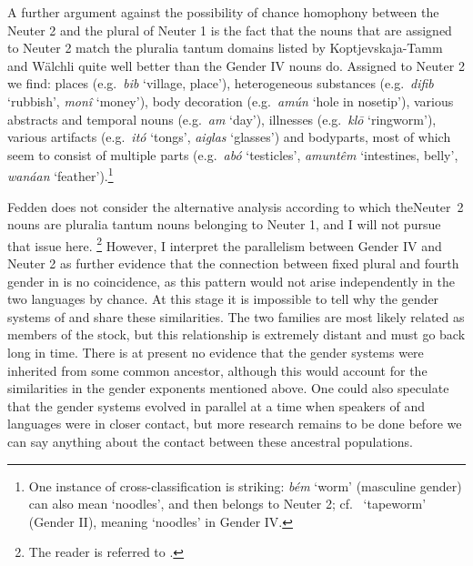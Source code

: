 \documentclass[output=collectionpaper]{langsci/langscibook}
\begin{document}
A further argument against the possibility of chance homophony between the  Neuter 2 and the plural of Neuter 1 is the fact that the nouns that are assigned to Neuter 2 match the pluralia tantum domains listed by Koptjevskaja-Tamm and W\"alchli quite well \textendash{} better than the  Gender IV nouns do. Assigned to  Neuter 2 we find: places (e.g.\ \emph{bib} `village, place'), heterogeneous substances (e.g.\ \emph{difib} `rubbish', \emph{mon\^i} `money'), body decoration (e.g.\ \emph{am\'un} `hole in nosetip'), various abstracts and temporal nouns (e.g.\ \emph{am} `day'), illnesses (e.g.\ \emph{kl\=o} `ringworm'), various artifacts (e.g.\ \emph{it\'o} `tongs', \emph{aiglas} `glasses') and bodyparts, most of which seem to consist of multiple parts (e.g.\ \emph{ab\'o} `testicles', \emph{amunt\^em} `intestines, belly', \emph{wan\'aan} `feather').\footnote{One instance of cross-classification is striking:  \emph{b\'em} `worm' (masculine gender) can also mean `noodles', and then belongs to Neuter 2; cf.\   `tapeworm' (Gender II), meaning `noodles' in Gender IV.}

Fedden does not consider the alternative analysis according to which the\linebreak Neuter~2 nouns are pluralia tantum nouns belonging to Neuter 1, and I will not pursue that issue here.%
\footnote{The reader is referred to \textcite{Corbett2017}.
} %
However, I interpret the parallelism between  Gender IV and  Neuter 2 as further evidence that the connection between fixed plural and fourth gender in  is no coincidence, as this pattern would not arise independently in the two languages by chance. At this stage it is impossible to tell why the gender systems of  and  share these similarities. The two families are most likely related as members of the  stock, but this relationship is extremely distant and must go back long in time. There is at present no evidence that the gender systems were inherited from some common ancestor, although this would account for the similarities in the gender exponents mentioned above. One could also speculate that the gender systems evolved in parallel at a time when speakers of  and  languages were in closer contact, but more research remains to be done before we can say anything about the contact between these ancestral populations.
\end{document}
